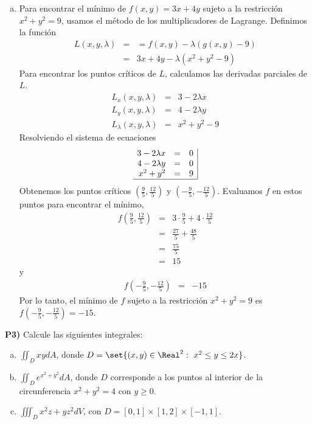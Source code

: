 \documentclass{article}
\begin{document}
\begin{enumerate}[a)]
  \newpage
  \item Para encontrar el mínimo de $f(x,y)=3x+4y$ sujeto a la restricción $x^2+y^2=9$, usamos el método de los multiplicadores de Lagrange. Definimos la función
    \begin{eqnarray*}
      L(x,y,\lambda) &=&= f(x,y) - \lambda(g(x,y)-9)\\
      &=& 3x+4y-\lambda(x^2+y^2-9)
    \end{eqnarray*}
  Para encontrar los puntos críticos de $L$, calculamos las derivadas parciales de $L$.
    \begin{eqnarray*}
      L_x(x,y,\lambda) &=& 3-2\lambda x\\
      L_y(x,y,\lambda) &=& 4-2\lambda y\\
      L_\lambda(x,y,\lambda) &=& x^2+y^2-9
    \end{eqnarray*}
  Resolviendo el sistema de ecuaciones
    $$\begin{array}{rcl|}
      3-2\lambda x &=& 0\\
      4-2\lambda y &=& 0\\
      x^2+y^2 &=& 9\\
      \hline
    \end{array}$$
  Obtenemos los puntos críticos $\left(\frac{9}{5},\frac{12}{5}\right)$ y $\left(-\frac{9}{5},-\frac{12}{5}\right)$. Evaluamos $f$ en estos puntos para encontrar el mínimo,
    \begin{eqnarray*}
      f\left(\frac{9}{5},\frac{12}{5}\right) &=& 3\cdot\frac{9}{5}+4\cdot\frac{12}{5}\\
      &=& \frac{27}{5}+\frac{48}{5}\\
      &=& \frac{75}{5}\\
      &=& 15
    \end{eqnarray*}
  y
    \begin{eqnarray*}
      f\left(-\frac{9}{5},-\frac{12}{5}\right) &=& -15
    \end{eqnarray*}
  Por lo tanto, el mínimo de $f$ sujeto a la restricción $x^2+y^2=9$ es $f\left(-\frac{9}{5},-\frac{12}{5}\right)=-15$.
\end{enumerate}

\newpage
\noindent\textbf{P3) } Calcule las siguientes integrales:
\begin{enumerate}[a)]
  \item $\displaystyle\iint_D xy dA$, donde $D=\set{(x,y)\in\Real^2:\ x^2\leq y\leq 2x}$.
  \item $\displaystyle\iint_D e^{x^2+y^2} dA$, donde $D$ corresponde a los puntos al interior de la circunferencia $x^2+y^2=4$ con $y\geq 0$.
  \item $\displaystyle\iiint_D x^2z+yz^2 dV$, con $D=[0,1]\times[1,2]\times[-1,1]$.
\end{enumerate}
\end{document}
